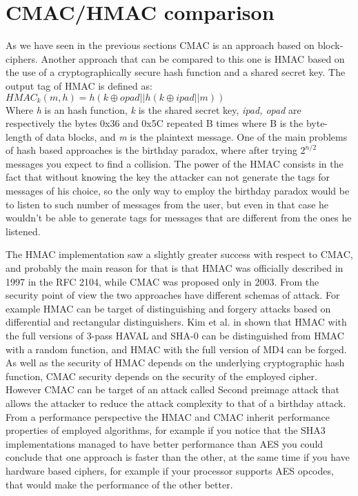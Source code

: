 \documentclass[11pt]{article}
\begin{document}
\section{CMAC/HMAC comparison}
As we have seen in the previous sections CMAC is an approach based on block-ciphers. Another approach that can be compared to this one is HMAC \cite{rfc2104} based on the use of a cryptographically secure hash function and a shared secret key. The output tag of HMAC is defined as:\\
$HMAC_k(m, h) = h(k \oplus opad || h(k \oplus ipad || m))$\\
Where \textit{h} is an hash function, \textit{k} is the shared secret key, \textit{ipad, opad} are respectively the bytes 0x36 and 0x5C repeated B times where B is the byte-length of data blocks, and \textit{m} is the plaintext message. One of the main problems of hash based approaches is the birthday paradox, where after trying $2^{n/2}$ messages you expect to find a collision. The power of the HMAC consists in the fact that without knowing the key the attacker can not generate the tags for messages of his choice, so the only way to employ the birthday paradox would be to listen to such number of messages from the user, but even in that case he wouldn't be able to generate tags for messages that are different from the ones he listened.

The HMAC implementation saw a slightly greater success with respect to CMAC, and probably the main reason for that is that HMAC was officially described in 1997 in the RFC 2104, while CMAC was proposed only in 2003. From the security point of view the two approaches have different schemas of attack. For example HMAC can be target of distinguishing and forgery attacks based on differential and rectangular distinguishers. Kim et al. in \cite{distinguisher} shown that HMAC with the full versions of 3-pass HAVAL and SHA-0 can be distinguished from HMAC with a random function, and HMAC with the full version of MD4 can be forged. As well as the security of HMAC depends on the underlying cryptographic hash function, CMAC security depends on the security of the employed cipher. However CMAC can be target of an attack called Second preimage attack \cite{secondpreimage} that allows the attacker to reduce the attack complexity to that of a birthday attack.
From a performance perspective the HMAC and CMAC inherit performance properties of employed algorithms, for example if you notice that the SHA3 implementations managed to have better performance than AES you could conclude that one approach is faster than the other, at the same time if you have hardware based ciphers, for example if your processor supports AES opcodes, that would make the performance of the other better.
\end{document}
